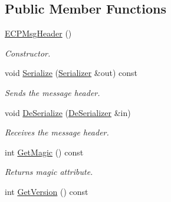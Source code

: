 \subsection*{Public Member Functions}
\begin{DoxyCompactItemize}
\item 
\hypertarget{class_common_1_1_e_c_p_msg_header_ab217fae80bb79e87cf7d4aa12e7175cb}{\hyperlink{class_common_1_1_e_c_p_msg_header_ab217fae80bb79e87cf7d4aa12e7175cb}{E\-C\-P\-Msg\-Header} ()}\label{class_common_1_1_e_c_p_msg_header_ab217fae80bb79e87cf7d4aa12e7175cb}

\begin{DoxyCompactList}\small\item\em Constructor. \end{DoxyCompactList}\item 
\hypertarget{class_common_1_1_e_c_p_msg_header_a900b44a6a9855c332ee967b3e15e3806}{void \hyperlink{class_common_1_1_e_c_p_msg_header_a900b44a6a9855c332ee967b3e15e3806}{Serialize} (\hyperlink{class_common_1_1_serializer}{Serializer} \&out) const }\label{class_common_1_1_e_c_p_msg_header_a900b44a6a9855c332ee967b3e15e3806}

\begin{DoxyCompactList}\small\item\em Sends the message header. \end{DoxyCompactList}\item 
\hypertarget{class_common_1_1_e_c_p_msg_header_af3c24a86eda3d3bdf66a565cab761406}{void \hyperlink{class_common_1_1_e_c_p_msg_header_af3c24a86eda3d3bdf66a565cab761406}{De\-Serialize} (\hyperlink{class_common_1_1_de_serializer}{De\-Serializer} \&in)}\label{class_common_1_1_e_c_p_msg_header_af3c24a86eda3d3bdf66a565cab761406}

\begin{DoxyCompactList}\small\item\em Receives the message header. \end{DoxyCompactList}\item 
\hypertarget{class_common_1_1_e_c_p_msg_header_aa3949f00cb45d7a958993b4ba1d92e86}{int \hyperlink{class_common_1_1_e_c_p_msg_header_aa3949f00cb45d7a958993b4ba1d92e86}{Get\-Magic} () const }\label{class_common_1_1_e_c_p_msg_header_aa3949f00cb45d7a958993b4ba1d92e86}

\begin{DoxyCompactList}\small\item\em Returns magic attribute. \end{DoxyCompactList}\item 
\hypertarget{class_common_1_1_e_c_p_msg_header_a80a0cb0910c2d0e516bd059ef2869f8f}{int \hyperlink{class_common_1_1_e_c_p_msg_header_a80a0cb0910c2d0e516bd059ef2869f8f}{Get\-Version} () const }\label{class_common_1_1_e_c_p_msg_header_a80a0cb0910c2d0e516bd059ef2869f8f}


\end{DoxyCompactItemize}
